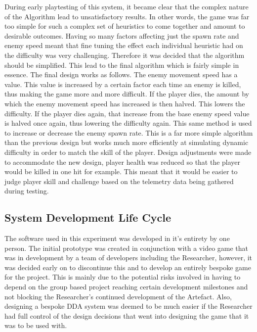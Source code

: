 \documentclass[journal]{IEEEtran}
\begin{document}
During early playtesting of this system, it became clear that the complex nature of the Algorithm lead to unsatisfactory results. In other words, the game was far too simple for such a complex set of heuristics to come together and amount to desirable outcomes. Having so many factors affecting just the spawn rate and enemy speed meant that fine tuning the effect each individual heuristic had on the difficulty was very challenging. Therefore it was decided that the algorithm should be simplified. This lead to the final algorithm which is fairly simple in essence. The final design works as follows. The enemy movement speed has a value. This value is increased by a certain factor each time an enemy is killed, thus making the game more and more difficult. If the player dies, the amount by which the enemy movement speed has increased is then halved. This lowers the difficulty. If the player dies again, that increase from the base enemy speed value is halved once again, thus lowering the difficulty again. This same method is used to increase or decrease the enemy spawn rate. This is a far more simple algorithm than the previous design but works much more efficiently at simulating dynamic difficulty in order to match the skill of the player. Design adjustments were made to accommodate the new design, player health was reduced so that the player would be killed in one hit for example. This meant that it would be easier to judge player skill and challenge based on the telemetry data being gathered during testing.



\subsection{System Development Life Cycle}

The software used in this experiment was developed in it's entirety by one person. The initial prototype was created in conjunction with a video game that was in development by a team of developers including the Researcher, however, it was decided early on to discontinue this and to develop an entirely bespoke game for the project. This is mainly due to the potential risks involved in having to depend on the group based project reaching certain development milestones and not blocking the Researcher's continued development of the Artefact. Also, designing a bespoke DDA system was deemed to be much easier if the Researcher had full control of the design decisions that went into designing the game that it was to be used with. 
\end{document}
